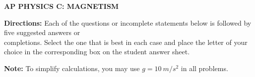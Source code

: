 \documentclass[11pt]{article}
\begin{document}
\pagestyle{fancy}
\chead{}
\lfoot{}\cfoot{-\textsf{\textbf{\thepage}}-}

\begin{center}
  \vspace{-.35in}
  {\large
    \textbf{AP PHYSICS C: MAGNETISM}
  }
\end{center}

\textbf{Directions:} Each of the questions or incomplete statements below is
followed by five suggested answers or\\
completions. Select the one that is best
in each case and place the letter of your choice in the corresponding box on
the student answer sheet.

\vspace{10pt}\textbf{Note:} To simplify calculations, you may use
$g=\SI{10}{m/s^2}$ in all problems.
\end{document}
